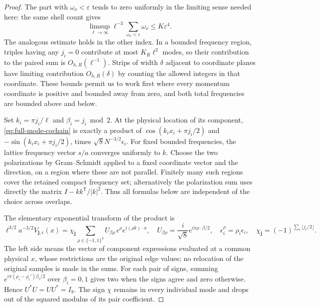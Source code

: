 \begin{proof}
The part with $\omega_\nu<\varepsilon$ tends to zero uniformly in
the limiting sense needed here: the same shell count gives
\[
 \limsup_{\ell\to\infty}\ell^{-3}
       \sum_{\omega_\nu<\varepsilon}\omega_\nu
       \le K\varepsilon^4.
\]
The analogous estimate holds in the other index. In a bounded
frequency region, triples having any $j_i=0$ contribute at most
$K_R\ell^2$ modes, so their contribution to the paired sum is
$O_{h,R}(\ell^{-1})$. Strips of width $\delta$ adjacent to coordinate
planes have limiting contribution $O_{h,R}(\delta)$ by counting the
allowed integers in that coordinate. These bounds permit us to work
first where every momentum coordinate is positive and bounded away
from zero, and both total frequencies are bounded above and below.

Set $k_i=\pi j_i/\ell$ and $\beta_i=j_i\bmod2$. At the physical
location of its component, \eqref{eq:full-mode-cochain} is exactly a
product of
$\cos(k_ix_i+\pi j_i/2)$ and $-\sin(k_ix_i+\pi j_i/2)$,
times $\sqrt8N^{-3/2}\epsilon_i$. For fixed bounded frequencies,
the lattice frequency vector $s/a$ converges uniformly to $k$.
Choose the two polarizations by Gram--Schmidt applied to a fixed
coordinate vector and the direction, on a region where these are not
parallel. Finitely many such regions cover the retained compact
frequency set; alternatively the polarization sum uses directly the
matrix $I-kk^{\mathsf T}/|k|^2$. Thus all formulas below are
independent of the choice across overlaps.

The elementary exponential transform of the product is
\begin{equation}\label{eq:full-parity-unitary}
 \ell^{3/2}a^{-3/2}V_{\boldsymbol j,\epsilon}(x)
   =\chi_{\boldsymbol j}\sum_{\rho\in\{-1,1\}^3}
       U_{\beta\rho}\,\epsilon^\rho e^{i(\rho k)\cdot x},
 \quad U_{\beta\rho}=\frac{i}{\sqrt8}e^{i\pi\rho\cdot\beta/2},
 \quad \epsilon^\rho_i=\rho_i\epsilon_i,
 \quad \chi_{\boldsymbol j}=(-1)^{\sum_i\lfloor j_i/2\rfloor}.
\end{equation}
The left side means the vector of component expressions evaluated
at a common physical $x$, whose restrictions are the original edge
values; no relocation of the original samples is made in the sums.
For each pair of signs, summing
$e^{i\pi(\rho_i-\rho_i')\beta_i/2}$ over $\beta_i=0,1$ gives two
when the signs agree and zero otherwise. Hence $U^*U=UU^*=I_8$.
The sign $\chi$ remains in every individual mode and drops out of
the squared modulus of its pair coefficient.


\end{proof}
